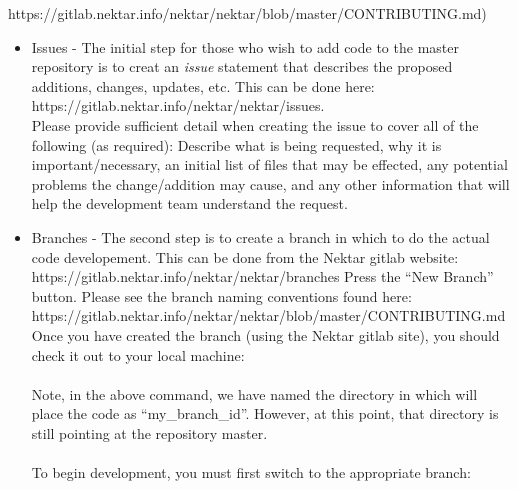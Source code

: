https://gitlab.nektar.info/nektar/nektar/blob/master/CONTRIBUTING.md) \\

\begin{itemize}
\item Issues - The initial step for those who wish to add code to the
  master repository is to creat an \textit{issue} statement that describes the
  proposed additions, changes, updates, etc.  This can be done here: \\
  
  https://gitlab.nektar.info/nektar/nektar/issues.  \\

  Please provide sufficient detail when creating the issue to cover
  all of the following (as required): Describe what is being
  requested, why it is important/necessary, an initial list of files
  that may be effected, any potential problems the change/addition may
  cause, and any other information that will help the development team
  understand the request. \\
  
\item Branches - The second step is to create a {\GIT} branch in which to do
  the actual code developement.  This can be done from the Nektar
  gitlab website: https://gitlab.nektar.info/nektar/nektar/branches
  Press the ``New Branch'' button.  Please see the branch naming
  conventions found here: \\
  https://gitlab.nektar.info/nektar/nektar/blob/master/CONTRIBUTING.md \\
  Once you have created the branch (using the Nektar gitlab site), you
  should check it out to your local machine: \\

 \\

  Note, in the above command, we have named the directory in which {\GIT}
  will place the code as ``my\_branch\_id''.  However, at this point,
  that directory is still pointing at the repository master. \\

 \\

  To begin development, you must first switch to the appropriate
  branch: \\


\end{itemize}

